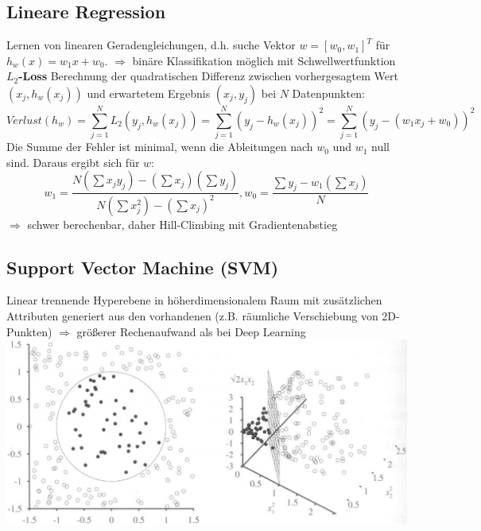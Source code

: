 \documentclass[12pt]{article}
\begin{document}
	\subsection{Lineare Regression}
	Lernen von linearen Geradengleichungen, d.h. suche Vektor $w = [w_0, w_1]^T$ für $h_w(x) = w_1 x + w_0$. $\Rightarrow$ binäre Klassifikation möglich mit Schwellwertfunktion\\
	\textbf{$L_2$-Loss} Berechnung der quadratischen Differenz zwischen vorhergesagtem Wert $(x_j, h_w(x_j))$ und erwartetem Ergebnis $(x_j, y_j)$ bei $N$ Datenpunkten:
	$$Verlust(h_w) = \sum_{j=1}^{N} L_2(y_j, h_w(x_j)) = \sum_{j=1}^{N} (y_j - h_w(x_j))^2 = \sum_{j=1}^{N} (y_j - (w_1 x_j + w_0))^2$$
	Die Summe der Fehler ist minimal, wenn die Ableitungen nach $w_0$ und $w_1$ null sind. Daraus ergibt sich für $w$:
	$$w_1 = \frac{N(\sum x_j y_j) - (\sum x_j)(\sum y_j)}{N(\sum x_j^2)-(\sum x_j)^2}, w_0 = \frac{\sum y_j - w_1 (\sum x_j)}{N}$$
	$\Rightarrow$ schwer berechenbar, daher Hill-Climbing mit Gradientenabstieg
	
	\subsection{Support Vector Machine (SVM)}
	Linear trennende Hyperebene in höherdimensionalem Raum mit zusätzlichen Attributen generiert aus den vorhandenen (z.B. räumliche Verschiebung von 2D-Punkten) $\Rightarrow$ größerer Rechenaufwand als bei Deep Learning\\
	\includegraphics[width=\linewidth]{figures/support-vector-machine.png}
	
\end{document}
